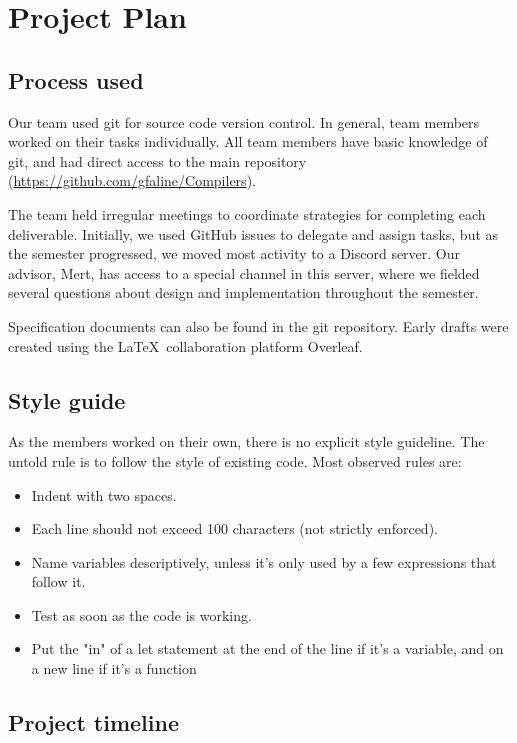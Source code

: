 \section{Project Plan} 

\subsection{Process used}

Our team used git for source code version control. In general, team members worked on
their tasks individually. All team members have basic knowledge of git, and had
direct access to the main repository (\url{https://github.com/gfaline/Compilers}).

The team held irregular meetings to coordinate strategies for completing each
deliverable. Initially, we used GitHub issues to delegate and assign tasks, but as the
semester progressed, we moved most activity to a Discord server. Our advisor, Mert, has
access to a special channel in this server, where we fielded several questions about
design and implementation throughout the semester.

Specification documents can also be found in the git repository. Early drafts were created using
the \LaTeX \ collaboration platform Overleaf.

\subsection{Style guide}

As the members worked on their own, there is no explicit style guideline. The untold rule is to
follow the style of existing code. Most observed rules are:

\begin{itemize}
\item Indent with two spaces.
\item Each line should not exceed 100 characters (not strictly enforced).
\item Name variables descriptively, unless it's only used by a few expressions that follow it.
\item Test as soon as the code is working.
\item Put the "in" of a let statement at the end of the line if it's a variable, and on a new
      line if it's a function
\end{itemize}

\subsection{Project timeline}

